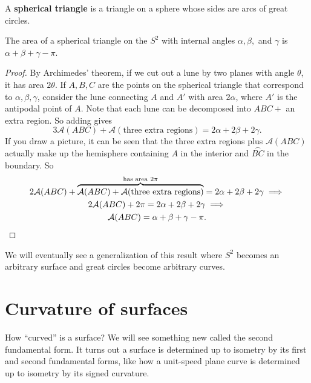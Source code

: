 \begin{definition}[]
    A \textbf{spherical triangle} is a triangle on a sphere whose sides are arcs of great circles.
\end{definition}
\begin{theorem}
    The area of a spherical triangle on the $S^2$ with internal angles $\alpha ,\beta ,$ and $\gamma $ is $\alpha +\beta +\gamma -\pi$.
\end{theorem}
\begin{proof}
    By Archimedes' theorem, if we cut out a lune by two planes with angle $\theta$, it has area $2\theta$. If $A,B,C$ are the points on the spherical triangle that correspond to $\alpha ,\beta ,\gamma $, consider the lune connecting $A$ and $A'$ with area $2\alpha $, where $A'$ is the antipodal point of $A$. Note that each lune can be decomposed into $ABC+$ an extra region. So adding gives \[
        3\mathcal{A} (ABC)+\mathcal{A} (\text{three extra regions})=2\alpha +2\beta +2\gamma .
    \] If you draw a picture, it can be seen that the three extra regions plus $\mathcal{A} (ABC)$ actually make up the hemisphere containing $A$ in the interior and $\overset{\frown}{BC} $ in the boundary. So 
    \begin{gather*}
        2\mathcal{A} (ABC)+\overset{\text{has area} \ 2\pi}{\overbrace{ \mathcal{A} (ABC)+\mathcal{A} (\text{three extra regions} )}} =2 \alpha +2\beta +2\gamma \implies \\
        2 \mathcal{A} (ABC)+2\pi=2\alpha +2\beta +2\gamma \implies \\
        \mathcal{A} (ABC)=\alpha +\beta +\gamma -\pi.\qedhere
    \end{gather*}
\end{proof}
We will eventually see a generalization of this result where $S^2$ becomes an arbitrary surface and great circles become arbitrary curves.

\section{Curvature of surfaces} 
How ``curved'' is a surface? We will see something new called the second fundamental form. It turns out a surface is determined up to isometry by its first and second fundamental forms, like how a unit-speed plane curve is determined up to isometry by its signed curvature.

